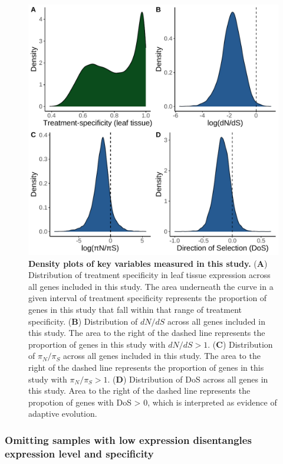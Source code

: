 \documentclass[12pt]{article}
\begin{document}
\begin{figure}[H]
\centering
\includegraphics[width=\textwidth]{figures/chapter_1/histogramsOfKeyVariables.pdf}
\caption{\textbf{Density plots of key variables measured in this study.} (\textbf{A}) Distribution of treatment specificity in leaf tissue expression across all genes included in this study. The area underneath the curve in a given interval of treatment specificity represents the proportion of genes in this study that fall within that range of treatment specificity. (\textbf{B}) Distribution of $dN/dS$ across all genes included in this study. The area to the right of the dashed line represents the proportion of genes in this study with $dN/dS > 1$. (\textbf{C}) Distribution of $\pi_N/\pi_S$ across all genes included in this study. The area to the right of the dashed line represents the proportion of genes in this study with $\pi_N/\pi_S > 1$. (\textbf{D}) Distribution of DoS across all genes in this study. Area to the right of the dashed line represents the propotion of genes with DoS > 0, which is interpreted as evidence of adaptive evolution.}%
\label{fig:histKeyVariables}
\end{figure}

\subsubsection*{Omitting samples with low expression disentangles expression level and specificity}
\end{document}
